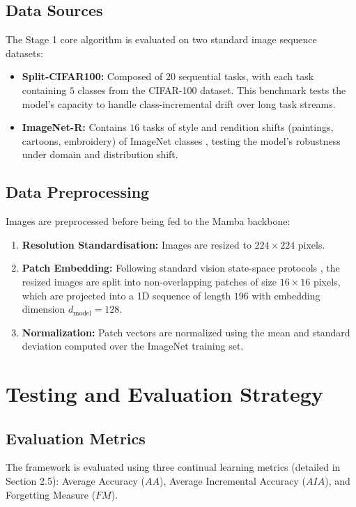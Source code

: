 \subsection{Data Sources}
The Stage 1 core algorithm is evaluated on two standard image sequence datasets:
\begin{itemize}
    \item \textbf{Split-CIFAR100:} Composed of $20$ sequential tasks, with each task containing $5$ classes from the CIFAR-100 dataset. This benchmark tests the model's capacity to handle class-incremental drift over long task streams.
    \item \textbf{ImageNet-R:} Contains $16$ tasks of style and rendition shifts (paintings, cartoons, embroidery) of ImageNet classes \cite{hendrycksManyFacesRobustness2021}, testing the model's robustness under domain and distribution shift.
\end{itemize}

\subsection{Data Preprocessing}
Images are preprocessed before being fed to the Mamba backbone:
\begin{enumerate}
    \item \textbf{Resolution Standardisation:} Images are resized to $224 \times 224$ pixels.
    \item \textbf{Patch Embedding:} Following standard vision state-space protocols \cite{taoLearning1DCausal, zhuVisionMambaEfficient2024}, the resized images are split into non-overlapping patches of size $16 \times 16$ pixels, which are projected into a 1D sequence of length $196$ with embedding dimension $d_{\text{model}}=128$.
    \item \textbf{Normalization:} Patch vectors are normalized using the mean and standard deviation computed over the ImageNet training set.
\end{enumerate}

\section{Testing and Evaluation Strategy}
\label{sec:testing_strategy}

\subsection{Evaluation Metrics}
The framework is evaluated using three continual learning metrics (detailed in Section 2.5): Average Accuracy ($AA$), Average Incremental Accuracy ($AIA$), and Forgetting Measure ($FM$). 

